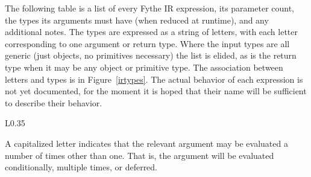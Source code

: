 The following table is a list of every Fythe IR expression, its parameter
count, the types its arguments must have (when reduced at runtime), and any
additional notes. The types are expressed as a string of letters, with each
letter corresponding to one argument or return type. Where the input types are
all generic (just objects, no primitives necessary) the list is elided, as is
the return type when it may be any object or primitive type. The association
between letters and types is in Figure~\ref{irtypes}. The actual behavior of
each expression is not yet documented, for the moment it is hoped that their
name will be sufficient to describe their behavior.


\begin{wrapfigure}{L}{0.35\textwidth}

A capitalized letter indicates that the relevant argument may be evaluated a
number of times other than one. That is, the argument will be evaluated
conditionally, multiple times, or deferred.

\caption{Fythe type identifiers}
\label{irtypes}
\end{wrapfigure}
